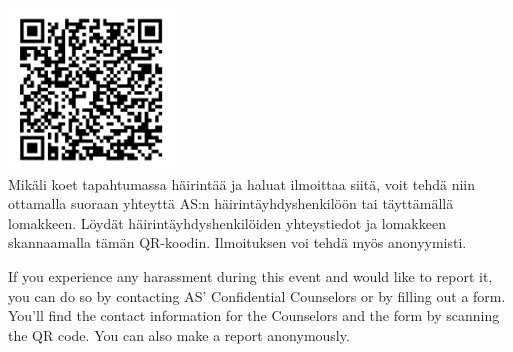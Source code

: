 \documentclass[10pt]{article}
\begin{document}


\newpage

\centering
\vfill
\includegraphics[scale=1.5]{kuvat/hary_QR_2023.png}\\
\Large
Mikäli koet tapahtumassa häirintää ja haluat ilmoittaa siitä, voit tehdä niin ottamalla suoraan yhteyttä AS:n häirintäyhdyshenkilöön tai täyttämällä lomakkeen. Löydät häirintäyhdyshenkilöiden yhteystiedot ja lomakkeen skannaamalla tämän QR-koodin. Ilmoituksen voi tehdä myös anonyymisti.

If you experience any harassment during this event and would like to report it, you can do so by contacting AS' Confidential Counselors or by filling out a form. You'll find the contact information for the Counselors and the form by scanning the QR code. You can also make a report anonymously.
\vfill
\end{document}

